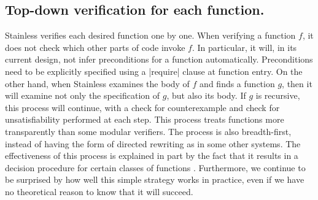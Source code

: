 \subsection{Top-down verification for each function.}
Stainless verifies each desired function one by one. When verifying a function $f$,
it does not check which other parts of code invoke $f$. In particular, it will, in its current design, not
infer preconditions for a function automatically. Preconditions
need to be explicitly specified using a |require| clause
at function entry. On the other hand, when Stainless examines the body of $f$ and finds a function $g$, then it
will examine not only the specification of $g$, but also its body. If $g$ is recursive, this process will continue,
with a check for counterexample and check for unsatisfiability performed at each step. This process
treats functions more transparently than some modular verifiers. The process is also breadth-first, instead
of having the form of directed rewriting as in some other systems. The effectiveness
of this process is explained in part by the fact that it results in a decision procedure
for certain classes of functions \cite{DBLP:conf/cade/Sofronie-Stokkermans09,
  SuterETAL10DecisionProceduresforAlgebraicDataTypesAbstractions,
  DBLP:journals/jar/PhamGW16}. Furthermore, we continue to be surprised
by how well this simple strategy works in practice, even if we have no theoretical reason to know that it will succeed.

